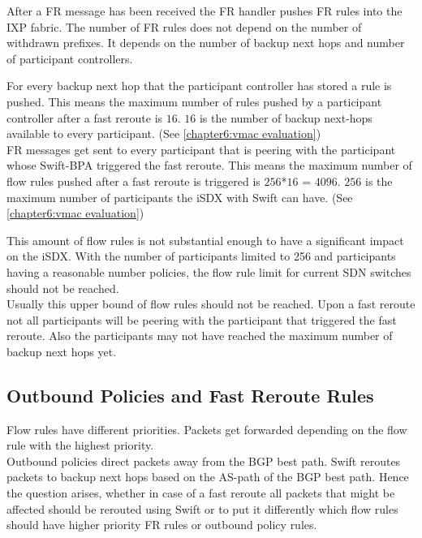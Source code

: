 After a FR message has been received the FR handler pushes FR rules into the IXP fabric. The number of FR rules does not depend on the number of withdrawn prefixes. It depends on the number of backup next hops and number of participant controllers. 

For every backup next hop that the participant controller has stored a rule is pushed. This means the maximum number of rules pushed by a participant controller after a fast reroute is $16$. $16$ is the number of backup next-hops available to every participant. (See \ref{chapter6:vmac evaluation}) \\
FR messages get sent to every participant that is peering with the participant whose Swift-BPA triggered the fast reroute. This means the maximum number of flow rules pushed after a fast reroute is triggered is $256$*$16$ = $4096$. $256$ is the maximum number of participants the iSDX with Swift can have. (See \ref{chapter6:vmac evaluation}) 

This amount of flow rules is not substantial enough to have a significant impact on the iSDX. With the number of participants limited to 256 and participants having a reasonable number policies, the flow rule limit for current SDN switches should not be reached. \cite[Figure 3 (a)]{gupta2016industrial}\\
Usually this upper bound of flow rules should not be reached. Upon a fast reroute not all participants will be peering with the participant that triggered the fast reroute. Also the participants may not have reached the maximum number of backup next hops yet.

\subsection{\label{chapter6:number of flow rules:outbound_FR}Outbound Policies and Fast Reroute Rules}

Flow rules have different priorities. Packets get forwarded depending on the flow rule with the highest priority. \\
Outbound policies direct packets away from the BGP best path. Swift reroutes packets to backup next hops based on the AS-path of the BGP best path. Hence the question arises, whether in case of a fast reroute all packets that might be affected should be rerouted using Swift or to put it differently which flow rules should have higher priority FR rules or outbound policy rules.

